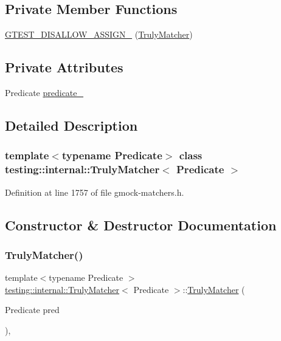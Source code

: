 \subsection*{Private Member Functions}
\begin{DoxyCompactItemize}
\item 
\hyperlink{classtesting_1_1internal_1_1TrulyMatcher_abea7de3761568ce8dc304db9788b69ef}{G\+T\+E\+S\+T\+\_\+\+D\+I\+S\+A\+L\+L\+O\+W\+\_\+\+A\+S\+S\+I\+G\+N\+\_\+} (\hyperlink{classtesting_1_1internal_1_1TrulyMatcher}{Truly\+Matcher})
\end{DoxyCompactItemize}
\subsection*{Private Attributes}
\begin{DoxyCompactItemize}
\item 
Predicate \hyperlink{classtesting_1_1internal_1_1TrulyMatcher_a5697cfc685ae7c8c690838650bdd2d0c}{predicate\+\_\+}
\end{DoxyCompactItemize}


\subsection{Detailed Description}
\subsubsection*{template$<$typename Predicate$>$\newline
class testing\+::internal\+::\+Truly\+Matcher$<$ Predicate $>$}



Definition at line 1757 of file gmock-\/matchers.\+h.



\subsection{Constructor \& Destructor Documentation}
\mbox{\label{classtesting_1_1internal_1_1TrulyMatcher_a9fdc4ddba121e0dad4773b5685e0f28d}} 
\subsubsection{\texorpdfstring{Truly\+Matcher()}{TrulyMatcher()}}
{\footnotesize\ttfamily template$<$typename Predicate $>$ \\
\hyperlink{classtesting_1_1internal_1_1TrulyMatcher}{testing\+::internal\+::\+Truly\+Matcher}$<$ Predicate $>$\+::\hyperlink{classtesting_1_1internal_1_1TrulyMatcher}{Truly\+Matcher} (\begin{DoxyParamCaption}\item[{Predicate}]{pred }\end{DoxyParamCaption})\hspace{0.3cm}{\ttfamily [inline]}, {\ttfamily [explicit]}}



